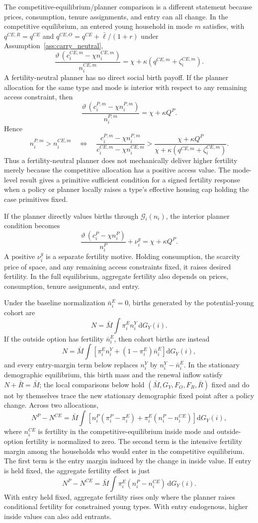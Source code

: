 \documentclass[11pt]{article}
\newcommand{\dd}{\mathrm d}
\newcommand{\1}{\mathbf 1}
\begin{document}
The competitive-equilibrium/planner comparison is a different statement because prices, consumption, tenure assignments, and entry can all change. In the competitive equilibrium, an entered young household in mode $m$ satisfies, with $q^{CE,R}=q^{CE}$ and $q^{CE,O}=q^{CE}+\bar\ell/(1+r)$ under Assumption~\ref{ass:carry_neutral},
\[
\frac{\vartheta\,(c_i^{CE,m}-\chi n_i^{CE,m})}{n_i^{CE,m}}
=
\chi+\kappa(q^{CE,m}+\zeta_i^{CE,m}).
\]
A fertility-neutral planner has no direct social birth payoff. If the planner allocation for the same type and mode is interior with respect to any remaining access constraint, then
\[
\frac{\vartheta\,(c_i^{P,m}-\chi n_i^{P,m})}{n_i^{P,m}}
=
\chi+\kappa Q^{P}.
\]
Hence
\[
n_i^{P,m}>n_i^{CE,m}
\quad\Longleftrightarrow\quad
\frac{c_i^{P,m}-\chi n_i^{P,m}}{c_i^{CE,m}-\chi n_i^{CE,m}}
>
\frac{\chi+\kappa Q^{P}}
{\chi+\kappa(q^{CE,m}+\zeta_i^{CE,m})}.
\]
Thus a fertility-neutral planner does not mechanically deliver higher fertility merely because the competitive allocation has a positive access value. The mode-level result gives a primitive sufficient condition for a signed fertility response when a policy or planner locally raises a type's effective housing cap holding the case primitives fixed.

If the planner directly values births through $\mathcal G_i(n_i)$, the interior planner condition becomes
\[
\frac{\vartheta\,(c_i^P-\chi n_i^P)}{n_i^P}+\nu_i^g
=
\chi+\kappa Q^{P}.
\]
A positive $\nu_i^g$ is a separate fertility motive. Holding consumption, the scarcity price of space, and any remaining access constraints fixed, it raises desired fertility. In the full equilibrium, aggregate fertility also depends on prices, consumption, tenure assignments, and entry.

Under the baseline normalization $\bar n_i^E=0$, births generated by the potential-young cohort are
\[
N
=
\bar M\int \pi_i^E n_i^Y\,\dd G_Y(i).
\]
If the outside option has fertility $\bar n_i^E$, then cohort births are instead
\[
N
=
\bar M\int
\left[
\pi_i^E n_i^Y+(1-\pi_i^E)\bar n_i^E
\right]\dd G_Y(i),
\]
and every entry-margin term below replaces $n_i^Y$ by $n_i^Y-\bar n_i^E$. In the stationary demographic equilibrium, this birth mass and the renewal inflow satisfy $N+\bar R=\bar M$; the local comparisons below hold $(\bar M,G_Y,F_O,F_R,\bar R)$ fixed and do not by themselves trace the new stationary demographic fixed point after a policy change.
Across two allocations,
\[
N^P-N^{CE}
=
\bar M\int
\left[
n_i^P(\pi_i^P-\pi_i^E)
+
\pi_i^E(n_i^P-n_i^{CE})
\right]\dd G_Y(i),
\]
where \(n_i^{CE}\) is fertility in the competitive-equilibrium inside mode and outside-option fertility is normalized to zero. The second term is the intensive fertility margin among the households who would enter in the competitive equilibrium. The first term is the entry margin induced by the change in inside value. If entry is held fixed, the aggregate fertility effect is just
\[
N^P-N^{CE}
=
\bar M\int
\pi_i^E(n_i^P-n_i^{CE})\,\dd G_Y(i).
\]
With entry held fixed, aggregate fertility rises only where the planner raises conditional fertility for constrained young types. With entry endogenous, higher inside values can also add entrants.
\end{document}
